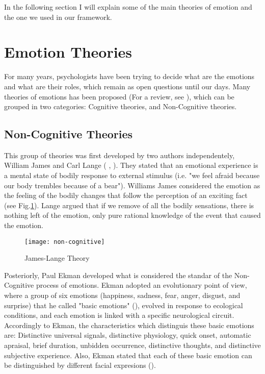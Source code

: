 In the following section I will explain some of the main theories of emotion and the one we used in our framework.



\section{Emotion Theories}

For many years, psychologists have been trying to decide what are the emotions and what are their roles, which remain as open questions until our days. Many theories of emotions has been proposed (For a review, see \cite{moors2009theories}), which can be grouped in two categories: Cognitive theories, and Non-Cognitive theories.
 


\subsection{Non-Cognitive Theories  }

This group of theories was first developed by two authors independentely, William James and Carl Lange (\cite{james1884emotion} , \cite{lange1885mechanism}). They stated that an emotional experience is a mental state of bodily response to external stimulus (i.e. "we feel afraid because our body trembles because of a bear"). Williams James considered the emotion as the feeling of the bodily changes that follow the perception of an exciting fact (see Fig.\ref{fig:james-langue}). Lange argued that if we remove of all the bodily sensations, there is nothing left of the emotion, only pure rational knowledge of the event that caused the emotion.

\begin{figure}[]
\centering
	\texttt{[image: non-cognitive]}
    \caption{James-Lange Theory}
\label{fig:james-langue}
\end{figure}

Posteriorly, Paul Ekman developed what is considered the standar of the Non-Cognitive process of emotions. Ekman adopted an evolutionary point of view, where a group of six emotions (happiness, sadness, fear, anger, disgust, and surprise) that he called "basic emotions" (\cite{ekman1992argument}), evolved in response to ecological conditions, and each emotion is linked with a specific neurological circuit. Accordingly to Ekman, the characteristics which distinguis these basic emotions are: Distinctive universal signals, distinctive physiology, quick onset, automatic apraisal, brief duration, unbidden occurrence, distinctive thoughts, and distinctive subjective experience. Also, Ekman stated that each of these basic emotion can be distinguished by different facial expresions (\cite{ekman1979facial}).


